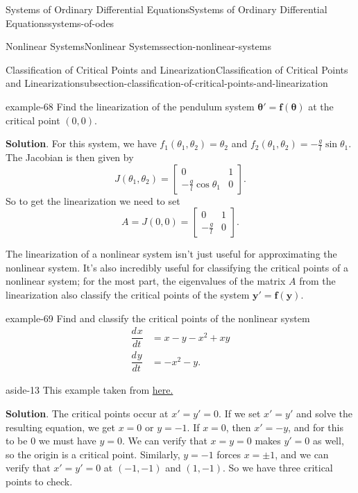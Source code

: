 \documentclass[oneside,10pt,]{book}
\numberwithin{equation}{section}
\renewcommand{\vec}[1]{\mathbf{#1}}
\newcommand{\vecm}[1]{\bm{#1}}
\newcommand{\dv}[3][]{\dfrac{d^{#1} #2}{d #3^{#1}}}
\newcommand{\vecm}[1]{\boldsymbol{#1}}
\newcommand{\amp}{&}
\begin{document}
\begin{chapterptx}{Systems of Ordinary Differential Equations}{}{Systems of Ordinary Differential Equations}{}{}{systems-of-odes}
\begin{sectionptx}{Nonlinear Systems}{}{Nonlinear Systems}{}{}{section-nonlinear-systems}
\begin{subsectionptx}{Classification of Critical Points and Linearization}{}{Classification of Critical Points and Linearization}{}{}{subsection-classification-of-critical-points-and-linearization}
%
\begin{example}{}{example-68}%
\hypertarget{p-410}{}%
Find the linearization of the pendulum system \(\vecm{\theta}' = \vec{f}(\vecm{\theta})\) at the critical point \((0,0)\).%
\par\smallskip%
\noindent\textbf{Solution}.\hypertarget{solution-65}{}\quad%
\hypertarget{p-411}{}%
For this system, we have \(f_{1}(\theta_{1},\theta_{2}) = \theta_{2}\) and \(f_{2}(\theta_{1},\theta_{2}) = -\frac{g}{l}\sin\theta_{1}\). The Jacobian is then given by%
\begin{equation*}
J(\theta_{1},\theta_{2}) = \begin{bmatrix}0 \amp  1 \\ -\frac{g}{l}\cos\theta_{1} \amp  0\end{bmatrix}.
\end{equation*}
So to get the linearization we need to set%
\begin{equation*}
A = J(0,0) = \begin{bmatrix}0 \amp  1 \\ -\frac{g}{l} \amp  0\end{bmatrix}.
\end{equation*}
%
\end{example}
\hypertarget{p-412}{}%
The linearization of a nonlinear system isn't just useful for approximating the nonlinear system. It's also incredibly useful for classifying the critical points of a nonlinear system; for the most part, the eigenvalues of the matrix \(A\) from the linearization also classify the critical points of the system \(\vec{y}' = \vec{f}(\vec{y})\).%
\begin{example}{}{example-69}%
\hypertarget{p-413}{}%
Find and classify the critical points of the nonlinear system%
\begin{align*}
\dv{x}{t} \amp = x - y - x^{2} + xy \\
\dv{y}{t} \amp = -x^{2} - y \text{.}
\end{align*}
%
\begin{aside}{}{aside-13}%
\hypertarget{p-414}{}%
This example taken from \href{https://www.math.uci.edu/\~ndonalds/math3d/nonlinear.pdf}{here.}%
\end{aside}
\par\smallskip%
\noindent\textbf{Solution}.\hypertarget{solution-66}{}\quad%
\hypertarget{p-415}{}%
The critical points occur at \(x' = y' = 0\). If we set \(x' = y'\) and solve the resulting equation, we get \(x = 0\) or \(y = -1\). If \(x = 0\), then \(x' = -y\), and for this to be \(0\) we must have \(y = 0\). We can verify that \(x = y = 0\) makes \(y' = 0\) as well, so the origin is a critical point. Similarly, \(y = -1\) forces \(x = \pm1\), and we can verify that \(x' = y' = 0\) at \((-1,-1)\) and \((1,-1)\). So we have three critical points to check.%

\end{example}
\end{subsectionptx}
\end{sectionptx}
\end{chapterptx}
\end{document}
